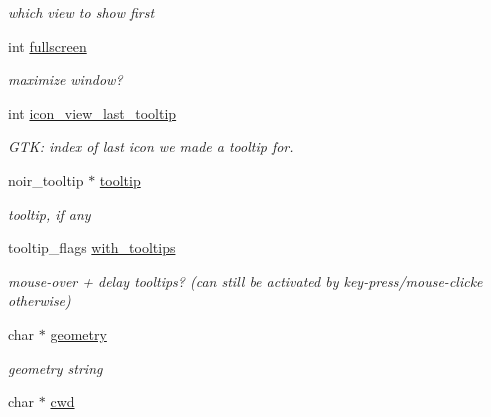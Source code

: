 \begin{CompactItemize}
\begin{CompactList}\small\item\em which view to show first \item\end{CompactList}\item 
\hypertarget{struct__noir__sess_o13}{
int \hyperlink{struct__noir__sess_o13}{fullscreen}}
\label{struct__noir__sess_o13}

\begin{CompactList}\small\item\em maximize window? \item\end{CompactList}\item 
\hypertarget{struct__noir__sess_o14}{
int \hyperlink{struct__noir__sess_o14}{icon\_\-view\_\-last\_\-tooltip}}
\label{struct__noir__sess_o14}

\begin{CompactList}\small\item\em GTK: index of last icon we made a tooltip for. \item\end{CompactList}\item 
\hypertarget{struct__noir__sess_o15}{
noir\_\-tooltip $\ast$ \hyperlink{struct__noir__sess_o15}{tooltip}}
\label{struct__noir__sess_o15}

\begin{CompactList}\small\item\em tooltip, if any \item\end{CompactList}\item 
\hypertarget{struct__noir__sess_o16}{
tooltip\_\-flags \hyperlink{struct__noir__sess_o16}{with\_\-tooltips}}
\label{struct__noir__sess_o16}

\begin{CompactList}\small\item\em mouse-over + delay tooltips? (can still be activated by key-press/mouse-clicke otherwise) \item\end{CompactList}\item 
\hypertarget{struct__noir__sess_o17}{
char $\ast$ \hyperlink{struct__noir__sess_o17}{geometry}}
\label{struct__noir__sess_o17}

\begin{CompactList}\small\item\em geometry string \item\end{CompactList}\item 
\hypertarget{struct__noir__sess_o18}{
char $\ast$ \hyperlink{struct__noir__sess_o18}{cwd}}
\label{struct__noir__sess_o18}


\end{CompactItemize}
